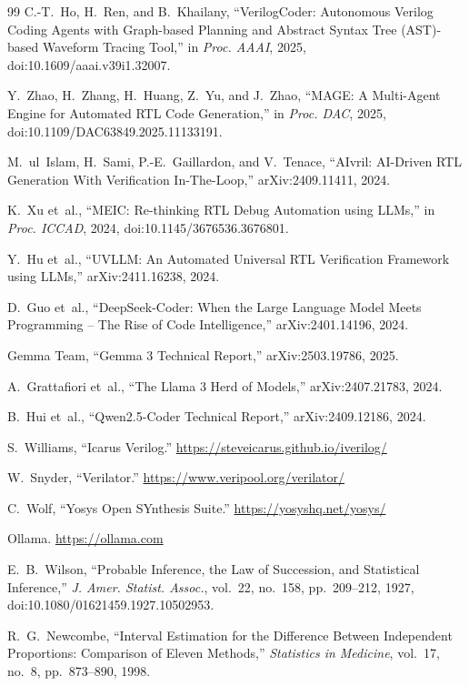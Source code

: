 \documentclass[11pt]{article}
\begin{document}
\begin{thebibliography}{99}
C.-T.~Ho, H.~Ren, and B.~Khailany, ``VerilogCoder: Autonomous Verilog Coding
Agents with Graph-based Planning and Abstract Syntax Tree (AST)-based Waveform
Tracing Tool,'' in \emph{Proc. AAAI}, 2025, doi:10.1609/aaai.v39i1.32007.

Y.~Zhao, H.~Zhang, H.~Huang, Z.~Yu, and J.~Zhao, ``MAGE: A Multi-Agent Engine
for Automated RTL Code Generation,'' in \emph{Proc. DAC}, 2025,
doi:10.1109/DAC63849.2025.11133191.

M.~ul~Islam, H.~Sami, P.-E.~Gaillardon, and V.~Tenace, ``AIvril: AI-Driven RTL
Generation With Verification In-The-Loop,'' arXiv:2409.11411, 2024.

K.~Xu et~al., ``MEIC: Re-thinking RTL Debug Automation using LLMs,'' in
\emph{Proc. ICCAD}, 2024, doi:10.1145/3676536.3676801.

Y.~Hu et~al., ``UVLLM: An Automated Universal RTL Verification Framework using
LLMs,'' arXiv:2411.16238, 2024.

D.~Guo et~al., ``DeepSeek-Coder: When the Large Language Model Meets
Programming -- The Rise of Code Intelligence,'' arXiv:2401.14196, 2024.

Gemma Team, ``Gemma 3 Technical Report,'' arXiv:2503.19786, 2025.

A.~Grattafiori et~al., ``The Llama 3 Herd of Models,'' arXiv:2407.21783, 2024.

B.~Hui et~al., ``Qwen2.5-Coder Technical Report,'' arXiv:2409.12186, 2024.

S.~Williams, ``Icarus Verilog.'' \url{https://steveicarus.github.io/iverilog/}

W.~Snyder, ``Verilator.'' \url{https://www.veripool.org/verilator/}

C.~Wolf, ``Yosys Open SYnthesis Suite.'' \url{https://yosyshq.net/yosys/}

Ollama. \url{https://ollama.com}

E.~B.~Wilson, ``Probable Inference, the Law of Succession, and Statistical
Inference,'' \emph{J. Amer. Statist. Assoc.}, vol.~22, no.~158, pp.~209--212,
1927, doi:10.1080/01621459.1927.10502953.

R.~G.~Newcombe, ``Interval Estimation for the Difference Between Independent
Proportions: Comparison of Eleven Methods,'' \emph{Statistics in Medicine},
vol.~17, no.~8, pp.~873--890, 1998.

\end{thebibliography}
\end{document}
